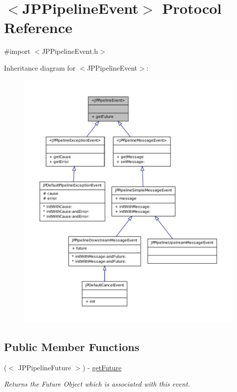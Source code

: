 \hypertarget{a00023}{
\section{$<$JPPipelineEvent$>$ Protocol Reference}
\label{a00023}
}


{\ttfamily \#import $<$JPPipelineEvent.h$>$}



Inheritance diagram for $<$JPPipelineEvent$>$:\nopagebreak
\begin{figure}[H]
\begin{center}
\leavevmode
\includegraphics[width=400pt]{a00130}
\end{center}
\end{figure}
\subsection*{Public Member Functions}
\begin{DoxyCompactItemize}
\item 
($<$ JPPipelineFuture $>$) -\/ \hyperlink{a00023_a0b8f8fd9917015f408e32291719aa1ad}{getFuture}
\begin{DoxyCompactList}\small\item\em Returns the Future Object which is associated with this event. \item\end{DoxyCompactList}\end{DoxyCompactItemize}


